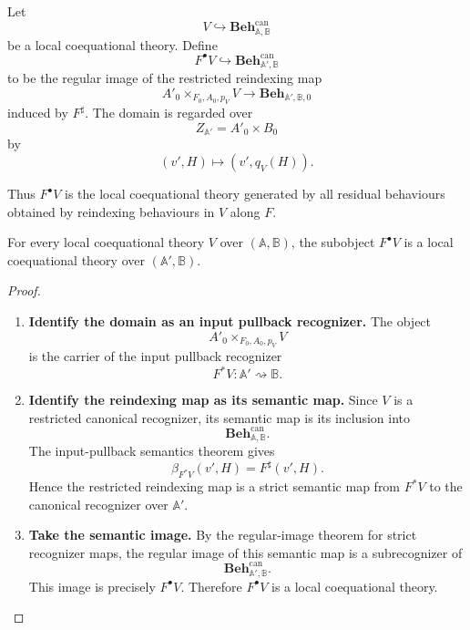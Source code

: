 \begin{definition}
\label{def:reindexed-local-theory}
    Let
    \[
        V\hookrightarrow
        \mathbf{Beh}^{\mathrm{can}}_{\mathbb A,\mathbb B}
    \]
    be a local coequational theory. Define
    \[
        F^\bullet V
        \hookrightarrow
        \mathbf{Beh}^{\mathrm{can}}_{\mathbb A',\mathbb B}
    \]
    to be the regular image of the restricted reindexing map
    \[
        A'_0\times_{F_0,A_0,p_V}V
        \longrightarrow
        \mathbf{Beh}_{\mathbb A',\mathbb B,0}
    \]
    induced by \(F^\sharp\). The domain is regarded over
    \[
        Z_{\mathbb A'}=A'_0\times B_0
    \]
    by
    \[
        (v',H)\longmapsto (v',q_V(H)).
    \]
\end{definition}

Thus \(F^\bullet V\) is the local coequational theory generated by all residual
behaviours obtained by reindexing behaviours in \(V\) along \(F\).

\begin{lemma}
\label{lem:reindexed-theories-local}
    For every local coequational theory \(V\) over \((\mathbb A,\mathbb B)\),
    the subobject \(F^\bullet V\) is a local coequational theory over
    \((\mathbb A',\mathbb B)\).
\end{lemma}

\begin{proof}
    \leavevmode
    \begin{enumerate}
        \item \textbf{Identify the domain as an input pullback recognizer.}
        The object
        \[
            A'_0\times_{F_0,A_0,p_V}V
        \]
        is the carrier of the input pullback recognizer
        \[
            F^*V:\mathbb A'\rightsquigarrow\mathbb B.
        \]

        \item \textbf{Identify the reindexing map as its semantic map.}
        Since \(V\) is a restricted canonical recognizer, its semantic map is
        its inclusion into
        \[
            \mathbf{Beh}^{\mathrm{can}}_{\mathbb A,\mathbb B}.
        \]
        The input-pullback semantics theorem gives
        \[
            \beta_{F^*V}(v',H)=F^\sharp(v',H).
        \]
        Hence the restricted reindexing map is a strict semantic map from
        \(F^*V\) to the canonical recognizer over \(\mathbb A'\).

        \item \textbf{Take the semantic image.}
        By the regular-image theorem for strict recognizer maps, the regular
        image of this semantic map is a subrecognizer of
        \[
            \mathbf{Beh}^{\mathrm{can}}_{\mathbb A',\mathbb B}.
        \]
        This image is precisely \(F^\bullet V\). Therefore \(F^\bullet V\) is a
        local coequational theory.
    \end{enumerate}
\end{proof}


